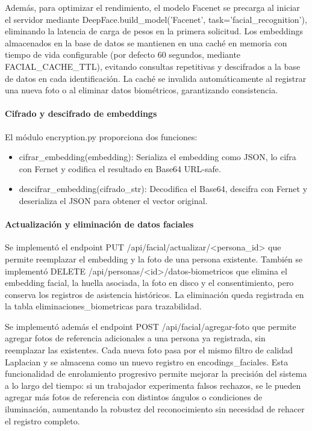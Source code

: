 Además, para optimizar el rendimiento, el modelo Facenet se precarga al iniciar el servidor mediante DeepFace.build\_model('Facenet', task='facial\_recognition'), eliminando la latencia de carga de pesos en la primera solicitud. Los embeddings almacenados en la base de datos se mantienen en una caché en memoria con tiempo de vida configurable (por defecto 60 segundos, mediante FACIAL\_CACHE\_TTL), evitando consultas repetitivas y descifrados a la base de datos en cada identificación. La caché se invalida automáticamente al registrar una nueva foto o al eliminar datos biométricos, garantizando consistencia.

\paragraph{Cifrado y descifrado de embeddings}

El módulo encryption.py proporciona dos funciones:

\begin{itemize}
    \item cifrar\_embedding(embedding): Serializa el embedding como JSON, lo cifra con Fernet y codifica el resultado en Base64 URL-safe.
    \item descifrar\_embedding(cifrado\_str): Decodifica el Base64, descifra con Fernet y deserializa el JSON para obtener el vector original.
\end{itemize}



\paragraph{Actualización y eliminación de datos faciales}

Se implementó el endpoint PUT /api/facial/actualizar/<persona\_id> que permite reemplazar el embedding y la foto de una persona existente. También se implementó DELETE /api/personas/<id>/datos-biometricos que elimina el embedding facial, la huella asociada, la foto en disco y el consentimiento, pero conserva los registros de asistencia históricos. La eliminación queda registrada en la tabla eliminaciones\_biometricas para trazabilidad.

Se implementó además el endpoint POST /api/facial/agregar-foto que permite agregar fotos de referencia adicionales a una persona ya registrada, sin reemplazar las existentes. Cada nueva foto pasa por el mismo filtro de calidad Laplacian y se almacena como un nuevo registro en encodings\_faciales. Esta funcionalidad de enrolamiento progresivo permite mejorar la precisión del sistema a lo largo del tiempo: si un trabajador experimenta falsos rechazos, se le pueden agregar más fotos de referencia con distintos ángulos o condiciones de iluminación, aumentando la robustez del reconocimiento sin necesidad de rehacer el registro completo.

